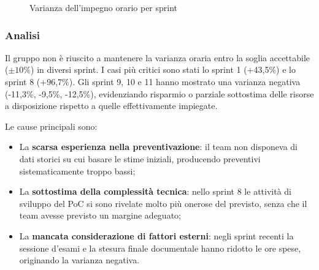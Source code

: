 \documentclass[a4paper,11pt,oneside]{scrartcl}
\begin{document}
\begin{figure}[H]
\centering
{}
\caption{Varianza dell'impegno orario per sprint}
\label{fig:varianza_ore}
\end{figure}

\subsubsection*{Analisi}

Il gruppo non è riuscito a mantenere la varianza oraria entro la soglia accettabile ($\pm 10\%$) in diversi sprint. I casi più critici sono stati lo sprint 1 (+43,5\%) e lo sprint 8 (+96,7\%). Gli sprint 9, 10 e 11 hanno mostrato una varianza negativa (-11,3\%, -9,5\%, -12,5\%), evidenziando risparmio o parziale sottostima delle risorse a disposizione rispetto a quelle effettivamente impiegate.

Le cause principali sono:
\begin{itemize}
    \item La \textbf{scarsa esperienza nella preventivazione}: il team non disponeva di dati storici su cui basare le stime iniziali, producendo preventivi sistematicamente troppo bassi;
    \item La \textbf{sottostima della complessità tecnica}: nello sprint 8 le attività di sviluppo del PoC si sono rivelate molto più onerose del previsto, senza che il team avesse previsto un margine adeguato;
    \item La \textbf{mancata considerazione di fattori esterni}: negli sprint recenti la sessione d'esami e la stesura finale documentale hanno ridotto le ore spese, originando la varianza negativa.
\end{itemize}
\end{document}
